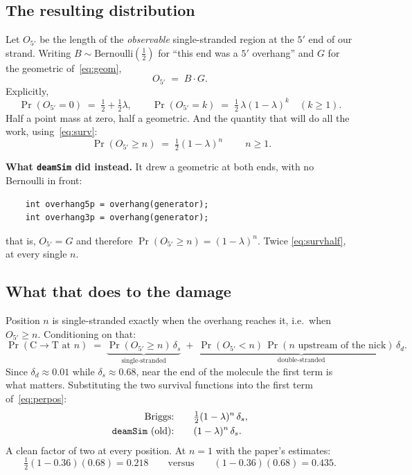 \documentclass[11pt,a4paper]{article}
\newcommand{\Ol}{O_{5'}}
\begin{document}
\subsection{The resulting distribution}

Let $\Ol$ be the length of the \emph{observable} single-stranded region at the $5'$
end of our strand. Writing $B \sim \mathrm{Bernoulli}(\tfrac12)$ for ``this end was a
$5'$ overhang'' and $G$ for the geometric of~\eqref{eq:geom},
\begin{equation}
\Ol \;=\; B \cdot G .
\end{equation}
Explicitly,
\begin{equation}
\Pr(\Ol = 0) \;=\; \tfrac12 + \tfrac12 \lambda ,
\qquad
\Pr(\Ol = k) \;=\; \tfrac12\, \lambda (1-\lambda)^k \quad (k \geq 1).
\label{eq:mixture}
\end{equation}
Half a point mass at zero, half a geometric. And the quantity that will do all the
work, using~\eqref{eq:surv}:
\begin{equation}
\boxed{\;\Pr(\Ol \geq n) \;=\; \tfrac12 (1-\lambda)^n \;}
\qquad n \geq 1 .
\label{eq:survhalf}
\end{equation}

\medskip
\noindent
\textbf{What \texttt{deamSim} did instead.} It drew a geometric at both ends, with no
Bernoulli in front:
\begin{verbatim}
    int overhang5p = overhang(generator);
    int overhang3p = overhang(generator);
\end{verbatim}
that is, $\Ol = G$ and therefore $\Pr(\Ol \geq n) = (1-\lambda)^n$. Twice
\eqref{eq:survhalf}, at every single $n$.

\subsection{What that does to the damage}

Position $n$ is single-stranded exactly when the overhang reaches it, i.e.\ when
$\Ol \geq n$. Conditioning on that:
\begin{equation}
\Pr(\text{C}\!\to\!\text{T at } n)
 \;=\; \underbrace{\Pr(\Ol \geq n)\, \delta_s}_{\text{single-stranded}}
 \;+\; \underbrace{\Pr(\Ol < n)\, \Pr(\text{$n$ upstream of the nick})\, \delta_d}_{\text{double-stranded}} .
\label{eq:perpos}
\end{equation}
Since $\delta_d \approx 0.01$ while $\delta_s \approx 0.68$, near the end of the
molecule the first term is what matters. Substituting the two survival functions into
the first term of~\eqref{eq:perpos}:
\begin{align}
\text{Briggs:}    \qquad & \tfrac12 (1-\lambda)^n\, \delta_s , \\
\text{\texttt{deamSim} (old):} \qquad & (1-\lambda)^n\, \delta_s .
\end{align}
A clean factor of two at every position. At $n = 1$ with the paper's estimates:
\begin{equation}
\tfrac12 (1 - 0.36)(0.68) = 0.218
\qquad \text{versus} \qquad
(1 - 0.36)(0.68) = 0.435 .
\end{equation}
\end{document}
